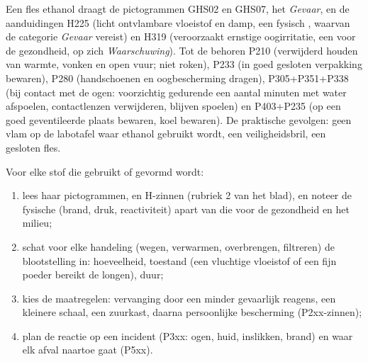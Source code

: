\begin{example}
Een fles ethanol draagt de pictogrammen GHS02 en GHS07, het 
\emph{Gevaar}, en de aanduidingen H225 (licht ontvlambare vloeistof en
damp, een fysisch , waarvan de categorie \emph{Gevaar} vereist) en
H319 (veroorzaakt ernstige oogirritatie, een  voor de gezondheid,
op zich \emph{Waarschuwing}). Tot de  behoren P210
(verwijderd houden van warmte, vonken en open vuur; niet roken), P233 (in
goed gesloten verpakking bewaren), P280 (handschoenen en oogbescherming
dragen), P305+P351+P338 (bij contact met de ogen: voorzichtig gedurende
een aantal minuten met water afspoelen, contactlenzen verwijderen, blijven
spoelen) en P403+P235 (op een goed geventileerde plaats bewaren, koel
bewaren). De praktische gevolgen: geen vlam op de labotafel waar ethanol
gebruikt wordt, een veiligheidsbril, een gesloten fles.
\end{example}

\begin{method}\label{met:b1:lab-techniques-1:read-sds}
Voor elke stof die gebruikt of gevormd wordt:
\begin{enumerate}
  \item lees haar pictogrammen,  en H-zinnen (rubriek 2 van
        het blad), en noteer de fysische  (brand, druk,
        reactiviteit) apart van die voor de gezondheid en het milieu;
  \item schat voor elke handeling (wegen, verwarmen, overbrengen,
        filtreren) de blootstelling in: hoeveelheid, toestand (een
        vluchtige vloeistof of een fijn poeder bereikt de longen), duur;
  \item kies de maatregelen: vervanging door een minder gevaarlijk
        reagens, een kleinere schaal, een zuurkast, daarna persoonlijke
        bescherming (P2xx-zinnen);
  \item plan de reactie op een incident (P3xx: ogen, huid, inslikken,
        brand) en waar elk afval naartoe gaat (P5xx).
\end{enumerate}
\end{method}

